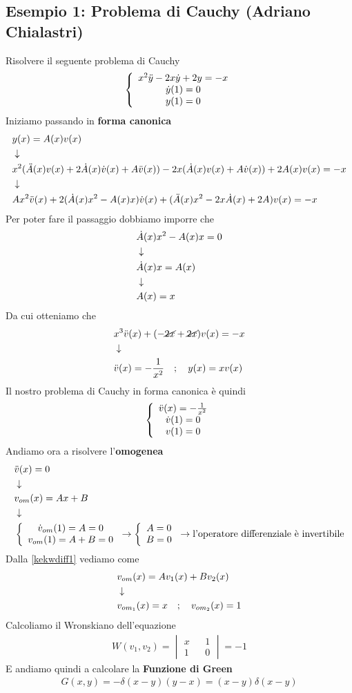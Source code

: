 \subsection{Esempio 1: Problema di Cauchy (Adriano Chialastri)}
Risolvere il seguente problema di Cauchy
\begin{align}
	\left\{ \begin{array}{ccc} x^2 \ddot{y} - 2x \dot{y} + 2y = -x\\ \dot{y}(1)=0\\ y(1)=0 \end{array} \right.
\end{align}
Iniziamo passando in \textbf{forma canonica}
\begin{align}
	&y(x) = A(x)v(x)	\\ &\downarrow \nonumber \\
	&x^2 (\ddot{A}(x)v(x) + 2\dot{A}(x)\dot{v}(x) + A \ddot{v}(x)) - 2x (\dot{A}(x)v(x) + A \dot{v}(x)) + 2A(x)v(x) = -x \nonumber \\ &\downarrow \nonumber \\
	&Ax^2 \ddot{v}(x) + 2(\dot{A}(x) x^2 - A(x)x) \dot{v}(x) + (\ddot{A}(x) x^2 - 2x\dot{A}(x) +2A)v(x) = -x	
\end{align}
Per poter fare il passaggio dobbiamo imporre che
\begin{align}
	&\dot{A}(x) x^2 - A(x)x = 0 \\ &\downarrow \nonumber \\
	&\dot{A}(x) x = A(x) \nonumber \\ &\downarrow \nonumber \\
	&A(x) = x  
\end{align}
Da cui otteniamo che
\begin{align}
	&x^3 \ddot{v}(x) + (-\cancel{2x} +\cancel{2x})v(x) = -x	\\ &\downarrow \nonumber \\
	&\ddot{v}(x) = -\frac{1}{x^2} \quad ; \quad y(x) = x v(x)
\end{align}
Il nostro problema di Cauchy in forma canonica è quindi
\begin{align}
	\left\{ \begin{array}{ccc} \ddot{v}(x) = -\frac{1}{x^2}\\ \dot{v}(1)=0\\ v(1)=0 \end{array} \right.
\end{align}
Andiamo ora a risolvere l'\textbf{omogenea}
\begin{align}
	&\ddot{v}(x) = 0 \\ &\downarrow \nonumber \\
	&v_{om}(x) = Ax + B  \label{kekwdiff1}\\ &\downarrow \nonumber \\
	&\left\{ \begin{array}{cc} \dot{v}_{om}(1)=A=0\\ v_{om}(1)=A+B=0 \end{array} \right. \to \left\{ \begin{array}{cc} A=0\\ B=0 \end{array} \right. \to \text{l'operatore differenziale è invertibile} 
\end{align}
Dalla \ref{kekwdiff1} vediamo come
\begin{align}
	&v_{om}(x) = A v_1(x) + B v_2(x) \nonumber \\ &\downarrow \nonumber \\
	&v_{om_1}(x) = x \quad ; \quad v_{om_2}(x) = 1
\end{align}
Calcoliamo il Wronskiano dell'equazione
\begin{align}
	W(v_1,v_2) = \begin{vmatrix}
		x && 1 \\
		1 && 0
	\end{vmatrix} = -1
\end{align}
E andiamo quindi a calcolare la \textbf{Funzione di Green}
\begin{align}
	G(x,y) = - \delta (x-y) (y-x) = (x-y) \delta(x-y)
\end{align}
